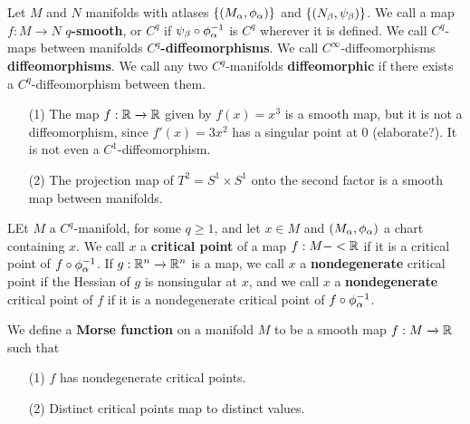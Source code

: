 \begin{definition}
    Let $M$ and $N$ manifolds with atlases  $\{(M_\alpha,\phi_\alpha)\}$ and $\{(N_\beta,
    \psi_\beta)\}$. We call a map $f:M \xrightarrow{} N$ \textbf{$q$-smooth}, or
    $C^q$ if  $\psi_\beta \circ \phi_\alpha^{-1}$ is $C^q$ wherever it is defined. We
    call  $C^q$-maps between manifolds  \textbf{$C^q$-diffeomorphisms}. We call
    $C^\infty$-diffeomorphisms  \textbf{diffeomorphisms}. We call any two
    $C^q$-manifolds  \textbf{diffeomorphic} if there exists a
    $C^q$-diffeomorphism between them.
\end{definition}

\begin{example}\label{example_1.7}
    \begin{enumerate}
        \item[(1)] The map $f:\mathbb{R} \xrightarrow{} \mathbb{R}$ given by $f(x)=x^3$ is a
            smooth map, but it is not a diffeomorphism, since $f'(x)=3x^2$ has a
            singular point at $0$ (elaborate?). It is not even a
            $C^1$-diffeomorphism.

        \item[(2)] The projection map of $T^2=S^1 \times S^1$ onto the second
            factor is a smooth map between manifolds.
    \end{enumerate}
\end{example}

\begin{definition}
    LEt $M$ a  $C^q$-manifold, for some  $q \geq 1$, and let  $x \in M$ and
    $(M_\alpha,\phi_\alpha)$ a chart containing $x$. We call  $x$ a  \textbf{critical
    point} of a map $f:M -< \mathbb{R}$ if it is a critical point of  $f \circ
    \phi_\alpha^{-1}$. If $g:\mathbb{R}^n \xrightarrow{} \mathbb{R}^n$ is a map, we call $x$ a
     \textbf{nondegenerate} critical point if the Hessian of $g$ is nonsingular
     at  $x$, and we call  $x$ a  \textbf{nondegenerate} critical point of $f$
     if it is a nondegenerate critical point of $f \circ \phi_\alpha^{-1}$.
\end{definition}

\begin{definition}
    We define a \textbf{Morse function} on a manifold $M$ to be a smooth map
    $f:M \xrightarrow{} \mathbb{R}$ such that
    \begin{enumerate}
        \item[(1)] $f$ has nondegenerate critical points.

        \item[(2)] Distinct critical points map to distinct values.
    \end{enumerate}
\end{definition}

